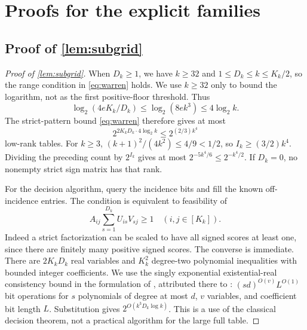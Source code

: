 \section{Proofs for the explicit families}\label{app:proofs-D}

\subsection[Proof of result subgrid]{Proof of \cref{lem:subgrid}}\label{proof:subgrid}
\begin{proof}[Proof of \cref{lem:subgrid}]
When $D_k\ge1$, we have $k\ge32$ and $1\le D_k\le k\le K_k/2$, so the range condition in \eqref{eq:warren} holds. We use $k\ge32$ only to bound the logarithm, not as the first positive-floor threshold. Thus
\[
 \log_2(4eK_k/D_k)\le\log_2(8e k^3)\le4\log_2k.
\]
The strict-pattern bound \eqref{eq:warren} therefore gives at most
\[
 2^{2K_kD_k\cdot4\log_2k}\le2^{(2/3)k^4}
\]
low-rank tables. For $k\ge3$, $(k+1)^2/(4k^2)\le4/9<1/2$, so $I_k\ge(3/2)k^4$. Dividing the preceding count by $2^{I_k}$ gives at most $2^{-5k^4/6}\le2^{-k^4/2}$. If $D_k=0$, no nonempty strict sign matrix has that rank.

For the decision algorithm, query the incidence bits and fill the known off-incidence entries. The condition is equivalent to feasibility of
\[
 A_{ij}\sum_{s=1}^{D_k}U_{is}V_{sj}\ge1\quad(i,j\in[K_k]).
\]
Indeed a strict factorization can be scaled to have all signed scores at least one, since there are finitely many positive signed scores. The converse is immediate. There are $2K_kD_k$ real variables and $K_k^2$ degree-two polynomial inequalities with bounded integer coefficients. We use the singly exponential existential-real consistency bound in the formulation of \citet{Vorobjov21}, attributed there to \citet{Renegar92}: $(sd)^{O(v)}L^{O(1)}$ bit operations for $s$ polynomials of degree at most $d$, $v$ variables, and coefficient bit length $L$. Substitution gives $2^{O(k^3D_k\log k)}$. This is a use of the classical decision theorem, not a practical algorithm for the large full table.
\end{proof}

